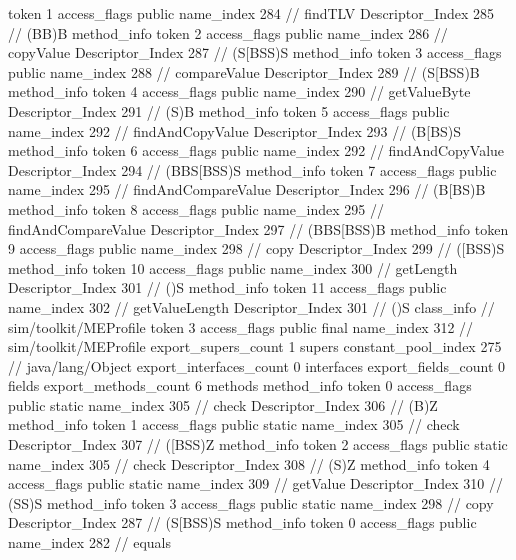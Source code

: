 {{{{{					token	1
					access_flags	public
					name_index	284		// findTLV
					Descriptor_Index	285		// (BB)B
				}
				method_info {
					token	2
					access_flags	public
					name_index	286		// copyValue
					Descriptor_Index	287		// (S[BSS)S
				}
				method_info {
					token	3
					access_flags	public
					name_index	288		// compareValue
					Descriptor_Index	289		// (S[BSS)B
				}
				method_info {
					token	4
					access_flags	public
					name_index	290		// getValueByte
					Descriptor_Index	291		// (S)B
				}
				method_info {
					token	5
					access_flags	public
					name_index	292		// findAndCopyValue
					Descriptor_Index	293		// (B[BS)S
				}
				method_info {
					token	6
					access_flags	public
					name_index	292		// findAndCopyValue
					Descriptor_Index	294		// (BBS[BSS)S
				}
				method_info {
					token	7
					access_flags	public
					name_index	295		// findAndCompareValue
					Descriptor_Index	296		// (B[BS)B
				}
				method_info {
					token	8
					access_flags	public
					name_index	295		// findAndCompareValue
					Descriptor_Index	297		// (BBS[BSS)B
				}
				method_info {
					token	9
					access_flags	public
					name_index	298		// copy
					Descriptor_Index	299		// ([BSS)S
				}
				method_info {
					token	10
					access_flags	public
					name_index	300		// getLength
					Descriptor_Index	301		// ()S
				}
				method_info {
					token	11
					access_flags	public
					name_index	302		// getValueLength
					Descriptor_Index	301		// ()S
				}
			}
		}
		class_info {		// sim/toolkit/MEProfile
			token	3
			access_flags	public final
			name_index	312		// sim/toolkit/MEProfile
			export_supers_count	1
			supers {
				constant_pool_index	275		// java/lang/Object
			}
			export_interfaces_count	0
			interfaces {
			}
			export_fields_count	0
			fields {
			}
			export_methods_count	6
			methods {
				method_info {
					token	0
					access_flags	public static
					name_index	305		// check
					Descriptor_Index	306		// (B)Z
				}
				method_info {
					token	1
					access_flags	public static
					name_index	305		// check
					Descriptor_Index	307		// ([BSS)Z
				}
				method_info {
					token	2
					access_flags	public static
					name_index	305		// check
					Descriptor_Index	308		// (S)Z
				}
				method_info {
					token	4
					access_flags	public static
					name_index	309		// getValue
					Descriptor_Index	310		// (SS)S
				}
				method_info {
					token	3
					access_flags	public static
					name_index	298		// copy
					Descriptor_Index	287		// (S[BSS)S
				}
				method_info {
					token	0
					access_flags	public
					name_index	282		// equals
}}}}}
